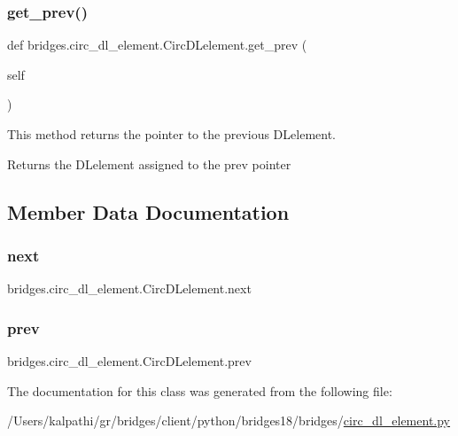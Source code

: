\subsubsection{\texorpdfstring{get\+\_\+prev()}{get\_prev()}}
{\footnotesize\ttfamily def bridges.\+circ\+\_\+dl\+\_\+element.\+Circ\+D\+Lelement.\+get\+\_\+prev (\begin{DoxyParamCaption}\item[{}]{self }\end{DoxyParamCaption})}



This method returns the pointer to the previous D\+Lelement. 

\begin{DoxyReturn}{Returns}
the D\+Lelement assigned to the prev pointer 
\end{DoxyReturn}


\subsection{Member Data Documentation}
\mbox{\label{classbridges_1_1circ__dl__element_1_1_circ_d_lelement_a0f01f7ff433628bac241d7c069a476fa}} 
\subsubsection{\texorpdfstring{next}{next}}
{\footnotesize\ttfamily bridges.\+circ\+\_\+dl\+\_\+element.\+Circ\+D\+Lelement.\+next}

\mbox{\label{classbridges_1_1circ__dl__element_1_1_circ_d_lelement_a78ed845303a07e303bcbb39f015843d0}} 
\subsubsection{\texorpdfstring{prev}{prev}}
{\footnotesize\ttfamily bridges.\+circ\+\_\+dl\+\_\+element.\+Circ\+D\+Lelement.\+prev}



The documentation for this class was generated from the following file\+:\begin{DoxyCompactItemize}
\item 
/\+Users/kalpathi/gr/bridges/client/python/bridges18/bridges/\mbox{\hyperlink{circ__dl__element_8py}{circ\+\_\+dl\+\_\+element.\+py}}\end{DoxyCompactItemize}
